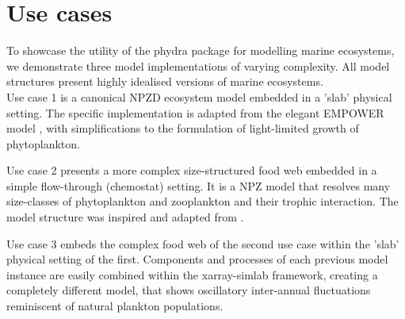 \documentclass[journal abbreviation, manuscript]{copernicus}
\begin{document}
\section{Use cases}

To showcase the utility of the phydra package for modelling marine ecosystems, we demonstrate three model implementations of varying complexity.
All model structures present highly idealised versions of marine ecosystems.\\

Use case 1 is a canonical NPZD ecosystem model embedded in a 'slab' physical setting. The specific implementation is adapted from the elegant EMPOWER model \citep{Anderson2015c}, with simplifications to the formulation of light-limited growth of phytoplankton.

Use case 2 presents a more complex size-structured food web embedded in a simple flow-through (chemostat) setting. It is a NPZ model that resolves many size-classes of phytoplankton and zooplankton and their trophic interaction. The model structure was inspired and adapted from \citet{Banas2011b}. 

Use case 3 embeds the complex food web of the second use case within the 'slab' physical setting of the first. Components and processes of each previous model instance are easily combined within the xarray-simlab framework, creating a completely different model, that shows oscillatory inter-annual fluctuations reminiscent of natural plankton populations. \\
\end{document}
